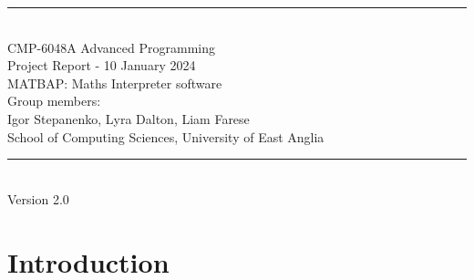 \documentclass[a4paper, oneside, 11pt]{report}
\begin{document}
\begin{titlepage}
\begin{center}
\rule{12cm}{1mm} \\
\vspace{1cm}
{\large  CMP-6048A Advanced Programming}
\vspace{7.5cm}
\\{\Large Project Report - 10 January 2024}
\vspace{1.5cm}
\\{\LARGE MATBAP: Maths Interpreter software}
\vspace{1.0cm}
\\{\Large Group members: \\ Igor Stepanenko, Lyra Dalton, Liam Farese\ }
\vspace{10.0cm}
\\{\large School of Computing Sciences, University of East Anglia}
\\ \rule{12cm}{0.5mm}
\\ \hspace{8.5cm} {\large Version 2.0}
\end{center}
\end{titlepage}


\setcounter{page}{1}


\begin{abstract}
Please replace this section with your own abstract. An abstract is a brief summary (maximum 250 words) of your entire project. It should cover your objectives, your methodologies used, a brief developmental history, your final results, in particular covering the optional tasks, and a discussion and conclusion. You do not cover the literature or background in an abstract nor should you use abbreviations or acronyms. The remainder of this report template has clear chapter titles and we suggest to stick to these although you can organise your material inside each chapter to your own preferences. A guideline in size is approximately 3,500 words (not including abstract, captions and references) but no real limit on figures, tables, diagrams, pseudo-code etc.
\end{abstract}

\chapter{Introduction}
\label{chap:intro}
\end{document}
